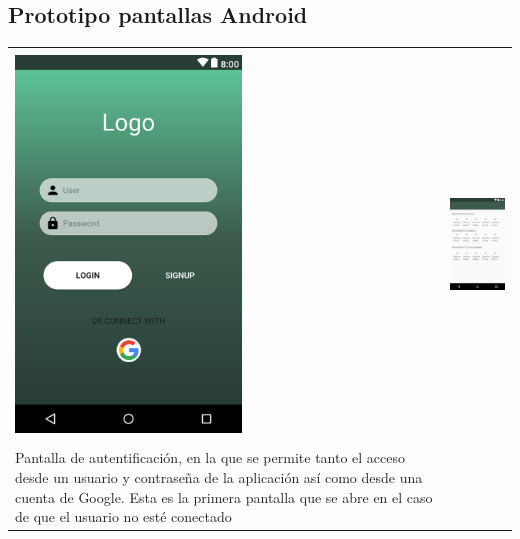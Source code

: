 \subsection{Prototipo pantallas Android}
\begin{tabular}{ p{6cm} p{6cm}}
\hline
\\
\includegraphics[width=6cm]{Figures/android/Login.png}
&
\includegraphics[width=6cm]{Figures/android/home.png} \\
\hline
\\
Pantalla de autentificación, en la que se permite tanto el acceso desde un usuario y contraseña de la aplicación así como desde una cuenta de Google. Esta es la primera pantalla que se abre en el caso de que el usuario no esté conectado

\end{tabular}
